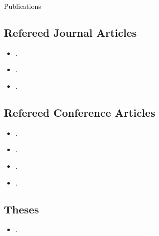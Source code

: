 \begin{rSection}{Publications}



    

\subsection*{Refereed Journal Articles}
\begin{itemize}
    \setlength\itemsep{0.5em}
    \item {}.
    \item {}.
    \item {}.
\end{itemize}

\subsection*{Refereed Conference Articles}
\begin{itemize}
    \setlength\itemsep{0.5em}
    \item {}.
    \item {}.
    \item {}.
    \item {}.
\end{itemize}

\subsection*{Theses}
\begin{itemize}
    \setlength\itemsep{0.5em}
    \item {}.
\end{itemize}

\end{rSection}